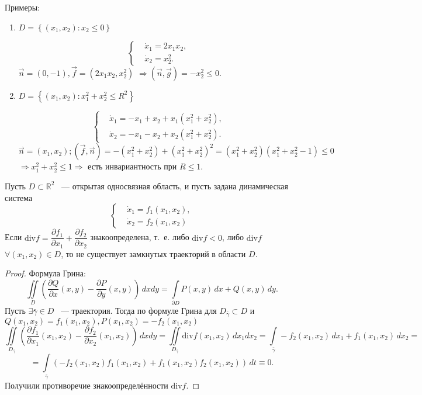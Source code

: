 Примеры:
\begin{enumerate}
\item  \( D = \left\lbrace (x_1, x_2): x_2 \leqslant 0 \right\rbrace \)

    \[ \left\lbrace \begin{aligned}
        & \dot{x}_1 = 2 x_1 x_2, \\
        & \dot{x}_2 = x_2^2.
    \end{aligned} \right. \]
    \( \vec{n} = (0, -1), \vec{f} = (2 x_1 x_2, x_2^2) \) \( \Rightarrow (\vec{n}, \vec{g}) = -x_2^2 \leqslant 0 \).

\item \( D = \left\lbrace (x_1, x_2): x_1^2 + x_2^2 \leqslant R^2 \right\rbrace \)

    \[ \left\lbrace \begin{aligned} 
        & \dot{x}_1 = -x_1 + x_2 + x_1 (x_1^2 + x_2^2), \\
        & \dot{x}_2 = -x_1 - x_2 + x_2 (x_1^2 + x_2^2).
    \end{aligned} \right. \]
    \( \vec{n} = (x_1, x_2); (\vec{f}, \vec{n}) = -(x_1^2 + x_2^2) + (x_1^2 + x_2^2)^2 = (x_1^2 + x_2^2) (x_1^2 + x_2^2 - 1) \leqslant 0 \) \(\Rightarrow x_1^2 + x_2^2 \leqslant 1 \Rightarrow \) есть инвариантность при \( R \leqslant 1 \).
\end{enumerate}

\begin{theorem}
Пусть \( D \subset \mathbb{R}^2 \) ~--- открытая односвязная область, и пусть задана динамическая система
\[ \left\lbrace \begin{aligned}
    & \dot{x}_1 = f_1(x_1, x_2), \\
    & \dot{x}_2 = f_2(x_1, x_2)
\end{aligned} \right. \]
Если \( \mathrm{div} f = \dfrac{\partial f_1}{\partial x_1} + \dfrac{\partial f_2}{\partial x_2} \) знакоопределена, т.~е. либо \( \mathrm{div} f < 0 \), либо \( \mathrm{div} f \) \( \forall (x_1, x_2) \in D \), то не существует замкнутых траекторий в области \( D \). 
\end{theorem}

\begin{proof}
    Формула Грина: 
    \[ \iint \limits_{D} \left( \dfrac{\partial Q}{\partial x} (x, y) - \dfrac{\partial P}{\partial y} (x, y) \right) \, dx dy = \int \limits_{\partial D} P(x, y) \, dx + Q(x, y) \, dy. \]
    Пусть \( \exists \bar{\gamma} \in D \) ~--- траектория. Тогда по формуле Грина для \( D_{\bar{\gamma}} \subset D\) и \( Q(x_1, x_2) = f_1(x_1, x_2), P(x_1, x_2) = -f_2(x_1, x_2) \)
    \[ \iint \limits_{D_{\bar{\gamma}}} \left( \dfrac{\partial f_1}{\partial x_1} (x_1, x_2) - \dfrac{\partial f_2}{\partial x_2} (x_1, x_2) \right) \, dx dy = \iint \limits_{D_{\bar{\gamma}}} \mathrm{div} f(x_1, x_2) \, dx_1 dx_2 = \int \limits_{\bar{\gamma}} -f_2(x_1, x_2) \, dx_1 + f_1(x_1, x_2) \, dx_2 = \]
    \[ = \int \limits_{\bar{\gamma}} \left( -f_2(x_1, x_2) f_1(x_1, x_2) + f_1(x_1, x_2) f_2(x_1, x_2) \right) \, dt \equiv 0. \]
    Получили противоречие знакоопределённости \( \mathrm{div} f \).
\end{proof}

